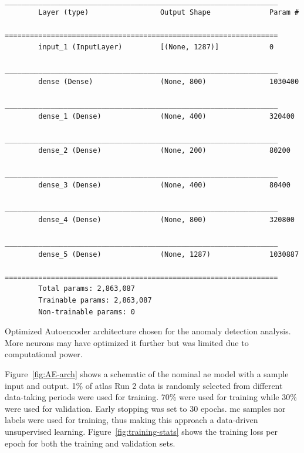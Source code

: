 \begin{table}[H]
    \begin{verbatim}
        _________________________________________________________________
        Layer (type)                 Output Shape              Param #
        =================================================================
        input_1 (InputLayer)         [(None, 1287)]            0
        _________________________________________________________________
        dense (Dense)                (None, 800)               1030400
        _________________________________________________________________
        dense_1 (Dense)              (None, 400)               320400
        _________________________________________________________________
        dense_2 (Dense)              (None, 200)               80200
        _________________________________________________________________
        dense_3 (Dense)              (None, 400)               80400
        _________________________________________________________________
        dense_4 (Dense)              (None, 800)               320800
        _________________________________________________________________
        dense_5 (Dense)              (None, 1287)              1030887
        =================================================================
        Total params: 2,863,087
        Trainable params: 2,863,087
        Non-trainable params: 0
        \end{verbatim}
        \caption{Optimized Autoencoder architecture chosen for the anomaly detection analysis. More neurons may have optimized it further but was limited due to computational power.}
        \label{tab:ae-arch}
\end{table}

Figure~\ref{fig:AE-arch} shows a schematic of the nominal \gls{ae} model with a sample input and output.
1\% of \gls{atlas} Run 2 data is randomly selected from different data-taking periods were used for training. 70\% were used for training while 30\% were used for validation. Early stopping was set to 30 epochs. 
\gls{mc} samples nor labels were used for training, thus making this approach a data-driven unsupervised learning. Figure~\ref{fig:training-stats} shows the training loss per epoch for both the training and validation sets. 

